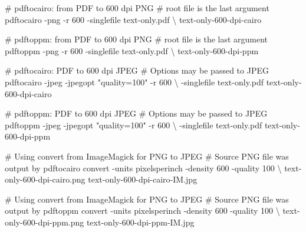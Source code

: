 \documentclass[
  11pt,
  british,
  a4paper,
]{article}
\newenvironment{Shaded}{\begin{snugshade}}{\end{snugshade}}
\newcommand{\AttributeTok}[1]{\textcolor[rgb]{0.80,0.80,0.80}{#1}}
\newcommand{\CommentTok}[1]{\textcolor[rgb]{0.50,0.62,0.50}{#1}}
\newcommand{\DataTypeTok}[1]{\textcolor[rgb]{0.87,0.87,0.75}{#1}}
\newcommand{\ExtensionTok}[1]{\textcolor[rgb]{0.80,0.80,0.80}{#1}}
\newcommand{\NormalTok}[1]{\textcolor[rgb]{0.80,0.80,0.80}{#1}}
\newcommand{\StringTok}[1]{\textcolor[rgb]{0.80,0.58,0.58}{#1}}
\begin{document}
\begin{Shaded}
\begin{Highlighting}[]
\CommentTok{\# \textasciigrave{}pdftocairo\textasciigrave{}: from PDF to 600 dpi PNG}
\CommentTok{\# root file is the last argument}
\ExtensionTok{pdftocairo} \AttributeTok{{-}png} \AttributeTok{{-}r}\NormalTok{ 600 }\AttributeTok{{-}singlefile}\NormalTok{ text{-}only.pdf }\DataTypeTok{\textbackslash{}}
\NormalTok{text{-}only{-}600{-}dpi{-}cairo}

\CommentTok{\# \textasciigrave{}pdftoppm\textasciigrave{}: from PDF to 600 dpi PNG}
\CommentTok{\# root file is the last argument}
\ExtensionTok{pdftoppm} \AttributeTok{{-}png} \AttributeTok{{-}r}\NormalTok{ 600 }\AttributeTok{{-}singlefile}\NormalTok{ text{-}only.pdf }\DataTypeTok{\textbackslash{}}
\NormalTok{text{-}only{-}600{-}dpi{-}ppm}

\CommentTok{\# \textasciigrave{}pdftocairo\textasciigrave{}: PDF to 600 dpi JPEG}
\CommentTok{\# Options may be passed to JPEG}
\ExtensionTok{pdftocairo} \AttributeTok{{-}jpeg} \AttributeTok{{-}jpegopt} \StringTok{"quality=100"} \AttributeTok{{-}r}\NormalTok{ 600 }\DataTypeTok{\textbackslash{}}
\NormalTok{{-}singlefile text{-}only.pdf text{-}only{-}600{-}dpi{-}cairo}

\CommentTok{\# \textasciigrave{}pdftoppm\textasciigrave{}: PDF to 600 dpi JPEG}
\CommentTok{\# Options may be passed to JPEG}
\ExtensionTok{pdftoppm} \AttributeTok{{-}jpeg} \AttributeTok{{-}jpegopt} \StringTok{"quality=100"} \AttributeTok{{-}r}\NormalTok{ 600 }\DataTypeTok{\textbackslash{}}
\NormalTok{{-}singlefile text{-}only.pdf text{-}only{-}600{-}dpi{-}ppm}

\CommentTok{\# Using \textasciigrave{}convert\textasciigrave{} from ImageMagick for PNG to JPEG}
\CommentTok{\# Source PNG file was output by \textasciigrave{}pdftocairo\textasciigrave{} }
\ExtensionTok{convert} \AttributeTok{{-}units}\NormalTok{ pixelsperinch }\AttributeTok{{-}density}\NormalTok{ 600 }\AttributeTok{{-}quality}\NormalTok{ 100 }\DataTypeTok{\textbackslash{}}
\NormalTok{text{-}only{-}600{-}dpi{-}cairo.png text{-}only{-}600{-}dpi{-}cairo{-}IM.jpg}

\CommentTok{\# Using \textasciigrave{}convert\textasciigrave{} from ImageMagick for PNG to JPEG}
\CommentTok{\# Source PNG file was output by \textasciigrave{}pdftoppm\textasciigrave{} }
\ExtensionTok{convert} \AttributeTok{{-}units}\NormalTok{ pixelsperinch }\AttributeTok{{-}density}\NormalTok{ 600 }\AttributeTok{{-}quality}\NormalTok{ 100 }\DataTypeTok{\textbackslash{}}
\NormalTok{text{-}only{-}600{-}dpi{-}ppm.png text{-}only{-}600{-}dpi{-}ppm{-}IM.jpg}
\end{Highlighting}
\end{Shaded}
\end{document}
